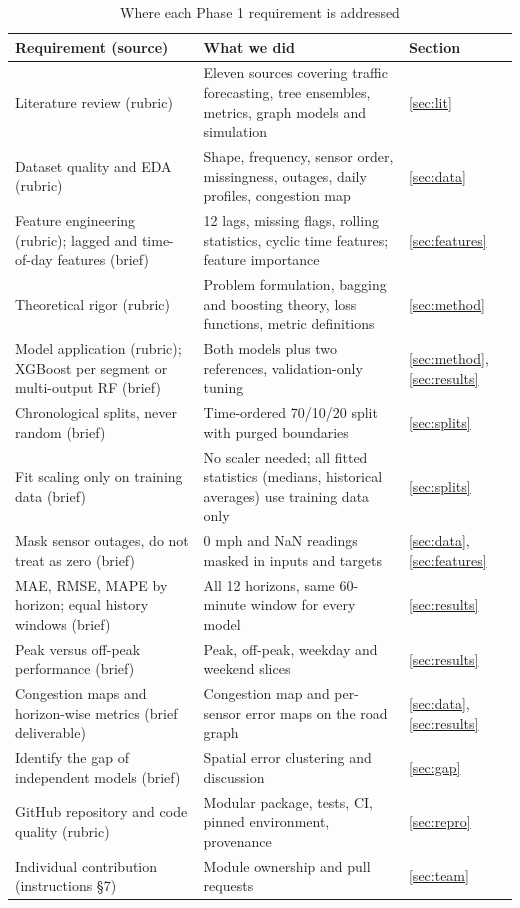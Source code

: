 \documentclass[conference]{IEEEtran}
\begin{document}
\begin{table}[t]
\centering
\caption{Where each Phase 1 requirement is addressed}
\label{tab:requirements}
\begin{tabular}{p{}p{}p{}}
\toprule
Requirement (source) & What we did & Section \\
\midrule
Literature review (rubric) & Eleven sources covering traffic forecasting, tree ensembles, metrics, graph models and simulation & \ref{sec:lit} \\
Dataset quality and EDA (rubric) & Shape, frequency, sensor order, missingness, outages, daily profiles, congestion map & \ref{sec:data} \\
Feature engineering (rubric); lagged and time-of-day features (brief) & 12 lags, missing flags, rolling statistics, cyclic time features; feature importance & \ref{sec:features} \\
Theoretical rigor (rubric) & Problem formulation, bagging and boosting theory, loss functions, metric definitions & \ref{sec:method} \\
Model application (rubric); XGBoost per segment or multi-output RF (brief) & Both models plus two references, validation-only tuning & \ref{sec:method}, \ref{sec:results} \\
Chronological splits, never random (brief) & Time-ordered 70/10/20 split with purged boundaries & \ref{sec:splits} \\
Fit scaling only on training data (brief) & No scaler needed; all fitted statistics (medians, historical averages) use training data only & \ref{sec:splits} \\
Mask sensor outages, do not treat as zero (brief) & 0 mph and NaN readings masked in inputs and targets & \ref{sec:data}, \ref{sec:features} \\
MAE, RMSE, MAPE by horizon; equal history windows (brief) & All 12 horizons, same 60-minute window for every model & \ref{sec:results} \\
Peak versus off-peak performance (brief) & Peak, off-peak, weekday and weekend slices & \ref{sec:results} \\
Congestion maps and horizon-wise metrics (brief deliverable) & Congestion map and per-sensor error maps on the road graph & \ref{sec:data}, \ref{sec:results} \\
Identify the gap of independent models (brief) & Spatial error clustering and discussion & \ref{sec:gap} \\
GitHub repository and code quality (rubric) & Modular package, tests, CI, pinned environment, provenance & \ref{sec:repro} \\
Individual contribution (instructions \S7) & Module ownership and pull requests & \ref{sec:team} \\
\bottomrule
\end{tabular}
\end{table}
\end{document}
